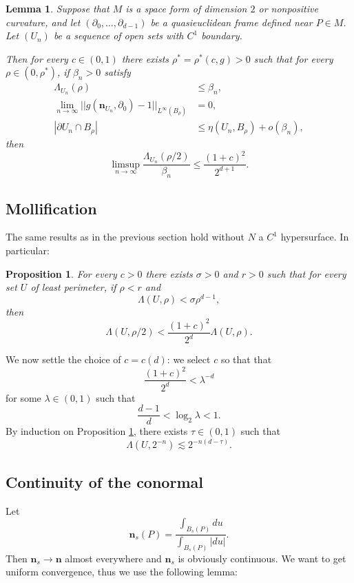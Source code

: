 \documentclass[reqno,12pt,letterpaper]{amsart}
\newcommand{\normal}{\mathbf n}
\newtheorem{lemma}[theorem]{Lemma}
\newtheorem{proposition}[theorem]{Proposition}
\theoremstyle{definition}
\numberwithin{equation}{section}
\begin{document}
\begin{lemma}\label{DGLC1}
Suppose that $M$ is a space form of dimension $2$ or nonpositive curvature, and let $(\partial_0, \dots, \partial_{d - 1})$ be a quasieuclidean frame defined near $P \in M$.
Let $(U_n)$ be a sequence of open sets with $C^1$ boundary.

Then for every $c \in (0, 1)$ there exists $\rho^* = \rho^*(c, g) > 0$ such that for every $\rho \in (0, \rho^*)$, if $\beta_n > 0$ satisfy
\begin{align}
\Lambda_{U_n}(\rho) &\leq \beta_n, \label{DGLC1 small excess}\\
\lim_{n \to \infty} ||g(\normal_{U_n}, \partial_0) - 1||_{L^\infty(B_\rho)} &= 0, \label{DGLC1 up normals}\\
|\partial U_n \cap B_\rho| &\leq \eta(U_n, B_\rho) + o(\beta_n), \label{DGLC1 almost minimal}
\end{align}
then
$$\limsup_{n \to \infty} \frac{\Lambda_{U_n}(\rho/2)}{\beta_n} \leq \frac{(1 + c)^2}{2^{d + 1}}.$$
\end{lemma}

\subsection{Mollification}
The same results as in the previous section hold without $N$ a $C^1$ hypersurface.
In particular:

\begin{proposition}\label{de Giorgi}
For every $c > 0$ there exists $\sigma > 0$ and $r > 0$ such that for every set $U$ of least perimeter, if
$\rho < r$ and
$$\Lambda(U, \rho) < \sigma \rho^{d - 1},$$
then
$$\Lambda(U, \rho/2) < \frac{(1 + c)^2}{2^d} \Lambda(U, \rho).$$
\end{proposition}

We now settle the choice of $c = c(d)$: we select $c$ so that that
$$\frac{(1 + c)^2}{2^d} < \lambda^{-d}$$
for some $\lambda \in (0, 1)$ such that
$$\frac{d - 1}{d} < \log_2 \lambda < 1.$$
By induction on Proposition \ref{de Giorgi}, there exists $\tau \in (0, 1)$ such that
\begin{equation}\label{inductive de Giorgi}
\Lambda(U, 2^{-n}) \lesssim 2^{-n(d - \tau)}.
\end{equation}

\subsection{Continuity of the conormal}
Let
$$\normal_s(P) = \frac{\int_{B_s(P)} du}{\int_{B_s(P)} |du|}.$$
Then $\normal_s \to \normal$ almost everywhere and $\normal_s$ is obviously continuous.
We want to get uniform convergence, thus we use the following lemma:
\end{document}
